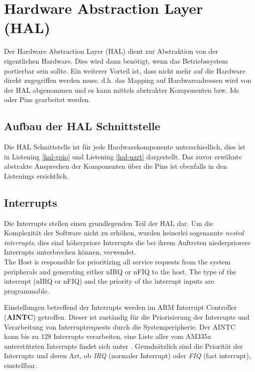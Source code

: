 \section{Hardware Abstraction Layer (HAL)}
Der Hardware Abstraction Layer (HAL) dient zur Abstraktion von der eigentlichen Hardware. Dies wird dann benötigt, wenn das Betriebssystem portierbar sein sollte. Ein weiterer Vorteil ist, dass nicht mehr auf die Hardware direkt zugegriffen werden muss, d.h. das Mapping auf Hardwareadressen wird von der HAL abgenommen und es kann mittels abstrakter Komponenten bzw. Ids oder Pins gearbeitet werden. 

\subsection{Aufbau der HAL Schnittstelle}
Die HAL Schnittstelle ist für jede Hardwarekomponente unterschiedlich, dies ist in Listening \ref{hal-gpio} und Listening \ref{hal-uart} dargestellt. Das zuvor erwähnte abstrakte Ansprechen der Komponenten über die Pins ist ebenfalls in den Listenings ersichtlich.





\subsection{Interrupts}

Die Interrupts stellen einen grundlegenden Teil der HAL dar. Um die Komplexität der Software nicht zu erhöhen, wurden keinerlei sogenannte \emph{nested interrupts}, dies sind höherpriore Interrupts die bei ihrem Auftreten niederpriorere Interrupts unterbrechen können, verwendet.\\


The Host is responsible for prioritizing all service requests from the
system peripherals and generating either nIRQ or nFIQ to the host. The type of the interrupt (nIRQ or
nFIQ) and the priority of the interrupt inputs are programmable.

Einstellungen betreffend der Interrupts werden im ARM Interrupt Controller (\textbf{AINTC}) getroffen. Dieser ist zuständig für die Priorisierung der Interrupts und Verarbeitung von Interruptrequests durch die Systemperipherie. Der AINTC kann bis zu 128 Interrupts verarbeiten, eine Liste aller vom AM335x unterstützten Interrupts findet sich unter \cite[S. 199]{ARM:TRM}. Grundsätzlich sind die Priorität der Interrupts und deren Art, ob \emph{IRQ} (normaler Interrupt) oder \emph{FIQ} (fast interrupt), einstellbar.\\ 

